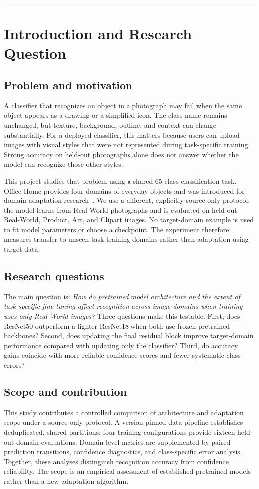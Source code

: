 \documentclass[10pt,a4paper]{article}
\begin{document}
\vspace{1mm}
\hrule

\section{Introduction and Research Question}
\subsection{Problem and motivation}
A classifier that recognizes an object in a photograph may fail when the same object appears as a drawing or a simplified icon. The class name remains unchanged, but texture, background, outline, and context can change substantially. For a deployed classifier, this matters because users can upload images with visual styles that were not represented during task-specific training. Strong accuracy on held-out photographs alone does not answer whether the model can recognize those other styles.

This project studies that problem using a shared 65-class classification task. Office-Home provides four domains of everyday objects and was introduced for domain adaptation research~\cite{officehome}. We use a different, explicitly source-only protocol: the model learns from Real-World photographs and is evaluated on held-out Real-World, Product, Art, and Clipart images. No target-domain example is used to fit model parameters or choose a checkpoint. The experiment therefore measures transfer to unseen task-training domains rather than adaptation using target data.

\subsection{Research questions}
The main question is: \emph{How do pretrained model architecture and the extent of task-specific fine-tuning affect recognition across image domains when training uses only Real-World images?} Three questions make this testable. First, does ResNet50 outperform a lighter ResNet18 when both use frozen pretrained backbones? Second, does updating the final residual block improve target-domain performance compared with updating only the classifier? Third, do accuracy gains coincide with more reliable confidence scores and fewer systematic class errors?

\subsection{Scope and contribution}
This study contributes a controlled comparison of architecture and adaptation scope under a source-only protocol. A version-pinned data pipeline establishes deduplicated, shared partitions; four training configurations provide sixteen held-out domain evaluations. Domain-level metrics are supplemented by paired prediction transitions, confidence diagnostics, and class-specific error analysis. Together, these analyses distinguish recognition accuracy from confidence reliability. The scope is an empirical assessment of established pretrained models rather than a new adaptation algorithm.
\end{document}
